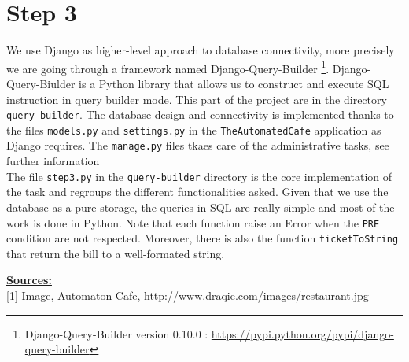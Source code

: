 \documentclass[a4paper,10pt]{article}
\begin{document}
\section*{Step 3}

We use Django as higher-level approach to database connectivity, more precisely we are going through a framework named Django-Query-Builder \footnote{Django-Query-Builder version 0.10.0 : \url{https://pypi.python.org/pypi/django-query-builder}}. Django-Query-Biulder is a Python library that allows us to construct and execute SQL instruction in query builder mode. This part of the project are in the directory \texttt{query-builder}. The database design and connectivity is implemented thanks to the files \texttt{models.py} and \texttt{settings.py} in the \texttt{TheAutomatedCafe} application as Django requires. The \texttt{manage.py} files tkaes care of the administrative tasks, see further information \href{https://docs.djangoproject.com/fr/1.9/ref/django-admin/}{\color{blue}{here}} \\

 The file \texttt{step3.py} in the \texttt{query-builder} directory is the core implementation of the task and regroups the different functionalities asked. Given that we use the database as a pure storage, the queries in SQL are really simple and most of the work is done in Python. Note that each function raise an Error when the \texttt{PRE} condition are not respected. Moreover, there is also the function \texttt{ticketToString} that return the bill to a well-formated string. 

\vspace{0.5cm}
\underline{\textbf{Sources:}} \\

[1] Image, Automaton Cafe, \url{http://www.draqie.com/images/restaurant.jpg}
\end{document}
